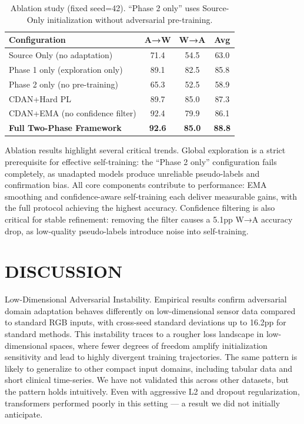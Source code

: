 \documentclass[conference]{IEEEtran}
\begin{document}
\begin{table}[!t]
\centering
\caption{Ablation study (fixed seed=42). ``Phase 2 only'' uses Source-Only initialization without adversarial pre-training.}
\label{tab:ablation}
\setlength{\tabcolsep}{5pt}
\begin{tabular}{lccc}
\toprule
Configuration & A→W & W→A & Avg \\
\midrule
Source Only (no adaptation)          & 71.4 & 54.5 & 63.0 \\
Phase 1 only (exploration only)        & 89.1 & 82.5 & 85.8 \\
Phase 2 only (no pre-training) & 65.3 & 52.5 & 58.9 \\
CDAN+Hard PL                           & 89.7 & 85.0 & 87.3 \\
CDAN+EMA (no confidence filter)                    & 92.4 & 79.9 & 86.1 \\
\textbf{Full Two-Phase Framework}         & \textbf{92.6} & \textbf{85.0} & \textbf{88.8} \\
\bottomrule
\end{tabular}
\end{table}

Ablation results highlight several critical trends. Global exploration is a strict prerequisite for effective self-training: the ``Phase 2 only'' configuration fails completely, as unadapted models produce unreliable pseudo-labels and confirmation bias. All core components contribute to performance: EMA smoothing and confidence-aware self-training each deliver measurable gains, with the full protocol achieving the highest accuracy. Confidence filtering is also critical for stable refinement: removing the filter causes a 5.1pp W→A accuracy drop, as low-quality pseudo-labels introduce noise into self-training.

\section{DISCUSSION}
\label{sec:discussion}

Low-Dimensional Adversarial Instability. Empirical results confirm adversarial domain adaptation behaves differently on low-dimensional sensor data compared to standard RGB inputs, with cross-seed standard deviations up to 16.2pp for standard methods. This instability traces to a rougher loss landscape in low-dimensional spaces, where fewer degrees of freedom amplify initialization sensitivity and lead to highly divergent training trajectories. The same pattern is likely to generalize to other compact input domains, including tabular data and short clinical time-series. We have not validated this across other datasets, but the pattern holds intuitively. Even with aggressive L2 and dropout regularization, transformers performed poorly in this setting — a result we did not initially anticipate.
\end{document}
